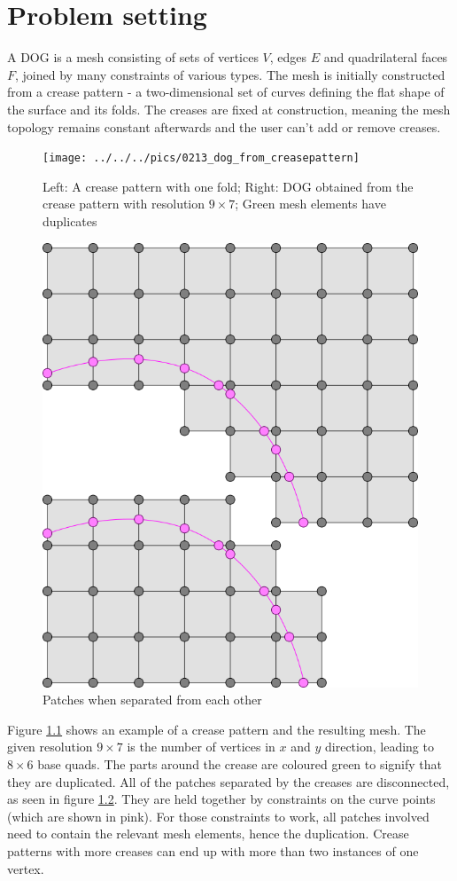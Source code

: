\documentclass[a4paper,twoside,12pt,nochapterprefix]{scrbook}
\begin{document}
\chapter{Problem setting}\label{sec:problem}
A DOG is a mesh consisting of sets of vertices $V$, edges $E$ and quadrilateral faces $F$, joined by many constraints of various types. The mesh is initially constructed from a crease pattern - a two-dimensional set of curves defining the flat shape of the surface and its folds. The creases are fixed at construction, meaning the mesh topology remains constant afterwards and the user can't add or remove creases.\newline
\begin{figure}
    \centering
    \texttt{[image: ../../../pics/0213\_dog\_from\_creasepattern]}
    \caption{Left: A crease pattern with one fold; Right: DOG obtained from the crease pattern with resolution $9 \times 7$; Green mesh elements have duplicates
      \label{fig:dog_from_creasepattern}}
\end{figure}
\begin{figure}
    \centering
    \includegraphics[width=0.33\linewidth]{figures/0224_patches_split}
    \caption{Patches when separated from each other
      \label{fig:patches_split}}
\end{figure}
Figure \ref{fig:dog_from_creasepattern} shows an example of a crease pattern and the resulting mesh. The given resolution $9 \times 7$ is the number of vertices in $x$ and $y$ direction, leading to $8 \times 6$ base quads. The parts around the crease are coloured green to signify that they are duplicated. All of the patches separated by the creases are disconnected, as seen in figure \ref{fig:patches_split}. They are held together by constraints on the curve points (which are shown in pink). For those constraints to work, all patches involved need to contain the relevant mesh elements, hence the duplication. Crease patterns with more creases can end up with more than two instances of one vertex.\newline
\end{document}
